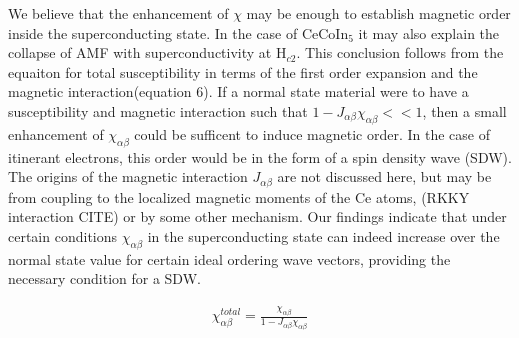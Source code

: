 \documentclass[usletter,aps,prb,10pt,amssymb,amsmath,twocolumn]{revtex4-1}
\begin{document}
We believe that the enhancement of $\chi$ may be enough to establish magnetic order inside the superconducting state. In the case of CeCoIn$_5$ it may also explain the collapse of AMF with superconductivity at H$_{c2}$. This conclusion follows from the equaiton for total susceptibility in terms of the first order expansion and the magnetic interaction(equation 6). If a normal state material were to have a susceptibility and magnetic interaction such that $1-J_{\alpha\beta} \chi_{\alpha\beta}<<1$, then a small enhancement of $\chi_{\alpha\beta}$ could be sufficent to induce magnetic order. In the case of itinerant electrons, this order would be in the form of a spin density wave (SDW). The origins of the magnetic interaction $J_{\alpha\beta}$ are not discussed here, but may be from coupling to the localized magnetic moments of the Ce atoms, (RKKY interaction CITE) or by some other mechanism. Our findings indicate that under certain conditions $\chi_{\alpha\beta}$ in the superconducting state can indeed increase over the normal state value for certain ideal ordering wave vectors, providing the necessary condition for a SDW.

\begin{align}
\chi^{total}_{\alpha\beta}=\frac{\chi_{\alpha\beta}}{1-J_{\alpha\beta} \chi_{\alpha\beta}}
\end{align}





{}

\end{document}
